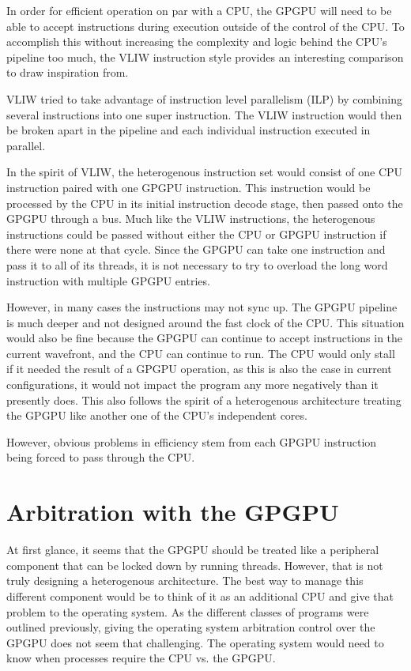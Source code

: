 In order for efficient operation on par with a CPU, the GPGPU will need to be able to accept instructions during execution outside of the control of the CPU. To accomplish this without increasing the complexity and logic behind the CPU's pipeline too much, the VLIW instruction style provides an interesting comparison to draw inspiration from. 

VLIW tried to take advantage of instruction level parallelism (ILP) by combining several instructions into one super instruction. The VLIW instruction would then be broken apart in the pipeline and each individual instruction executed in parallel. 

In the spirit of VLIW, the heterogenous instruction set would consist of one CPU instruction paired with one GPGPU instruction. This instruction would be processed by the CPU in its initial instruction decode stage, then passed onto the GPGPU through a bus. Much like the VLIW instructions, the heterogenous instructions could be passed without either the CPU or GPGPU instruction if there were none at that cycle. Since the GPGPU can take one instruction and pass it to all of its threads, it is not necessary to try to overload the long word instruction with multiple GPGPU entries.

However, in many cases the instructions may not sync up. The GPGPU pipeline is much deeper and not designed around the fast clock of the CPU. This situation would also be fine because the GPGPU can continue to accept instructions in the current wavefront, and the CPU can continue to run. The CPU would only stall if it needed the result of a GPGPU operation, as this is also the case in current configurations, it would not impact the program any more negatively than it presently does. This also follows the spirit of a heterogenous architecture treating the GPGPU like another one of the CPU's independent cores. 

However, obvious problems in efficiency stem from each GPGPU instruction being forced to pass through the CPU. 


\section*{Arbitration with the GPGPU}

At first glance, it seems that the GPGPU should be treated like a peripheral component that can be locked down by running threads. However, that is not truly designing a heterogenous architecture. The best way to manage this different component would be to think of it as an additional CPU and give that problem to the operating system. As the different classes of programs were outlined previously, giving the operating system arbitration control over the GPGPU does not seem that challenging. The operating system would need to know when processes require the CPU vs. the GPGPU. 









